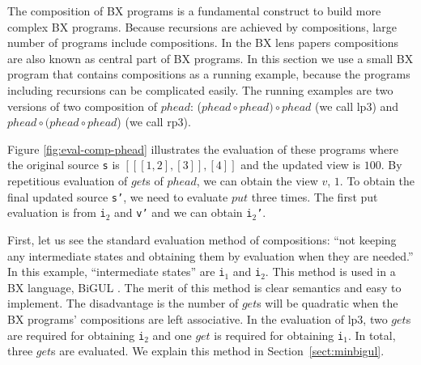 The composition of BX programs is a fundamental construct to build more complex BX programs.
Because recursions are achieved by compositions, large number of programs include compositions.
In the BX lens papers \cite{Bohannon06relationallenses:, Bohannon:2008:BRL:1328438.1328487} compositions are also known as central part of BX programs.
In this section we use a small BX program that contains compositions as a running example, because the programs including recursions can be complicated easily. The running examples are two versions of two composition of $phead$: ($phead \circ phead) \circ phead$ (we call lp3) and $phead \circ (phead \circ phead$) (we call rp3).



Figure \ref{fig:eval-comp-phead} illustrates the evaluation of these programs where the original source \texttt{s} is ${[[[1,2],[3]],[4]]}$ and the updated view is ${100}$.
By repetitious evaluation of $get$s of $phead$, we can obtain the view $v$, ${1}$. To obtain the final updated source \texttt{s'}, we need to evaluate $put$ three times. The first put evaluation is from \texttt{i$_2$} and \texttt{v'} and we can obtain \texttt{i$_2$'}.

First, let us see the standard evaluation method of compositions: ``not keeping any intermediate states and obtaining them by evaluation when they are needed.'' In this example, ``intermediate states'' are \texttt{i$_1$} and \texttt{i$_2$}. This method is used in a BX language, BiGUL \cite{Ko:2016:BFV:2847538.2847544,Ko:2017:ABB:3177123.3158129}. The merit of this method is clear semantics and easy to implement. The disadvantage is the number of $get$s will be quadratic when the BX programs' compositions are left associative. In the evaluation of lp3, two $get$s are required for obtaining \texttt{i$_2$} and one $get$ is required for obtaining \texttt{i$_1$}. In total, three $get$s are evaluated. We explain this method in Section~\ref{sect:minbigul}.

